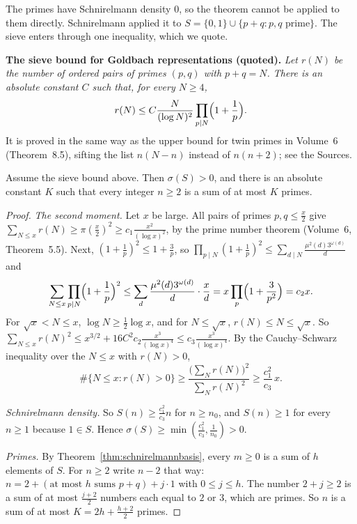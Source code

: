 The primes have Schnirelmann density $0$, so the theorem cannot be applied to them directly. Schnirelmann applied it to $S=\{0,1\}\cup\{p+q:p,q\text{ prime}\}$. The sieve enters through one inequality, which we quote.

\medskip\noindent\textbf{The sieve bound for Goldbach representations (quoted).} \emph{Let $r(N)$ be the number of ordered pairs of primes $(p,q)$ with $p+q=N$. There is an absolute constant $C$ such that, for every $N\ge4$,
\[
r(N)\le C\frac N{(\log N)^2}\prod_{p\mid N}\Bigl(1+\frac1p\Bigr).
\]}
It is proved in the same way as the upper bound for twin primes in Volume~6 (Theorem~8.5), sifting the list $n(N-n)$ instead of $n(n+2)$; see the Sources.

\begin{proposition}\label{prop:goldbachdensity}
Assume the sieve bound above. Then $\sigma(S)>0$, and there is an absolute constant $K$ such that every integer $n\ge2$ is a sum of at most $K$ primes.
\end{proposition}
\begin{proof}
\emph{The second moment.} Let $x$ be large. All pairs of primes $p,q\le\frac x2$ give $\sum_{N\le x}r(N)\ge\pi(\frac x2)^2\ge c_1\frac{x^2}{(\log x)^2}$, by the prime number theorem (Volume~6, Theorem~5.5). Next, $(1+\frac1p)^2\le1+\frac3p$, so $\prod_{p\mid N}(1+\frac1p)^2\le\sum_{d\mid N}\frac{\mu^2(d)3^{\omega(d)}}d$ and
\[
\sum_{N\le x}\prod_{p\mid N}\Bigl(1+\frac1p\Bigr)^2\le\sum_d\frac{\mu^2(d)3^{\omega(d)}}d\cdot\frac xd=x\prod_p\Bigl(1+\frac3{p^2}\Bigr)=c_2x.
\]
For $\sqrt x<N\le x$, $\log N\ge\frac12\log x$, and for $N\le\sqrt x$, $r(N)\le N\le\sqrt x$. So $\sum_{N\le x}r(N)^2\le x^{3/2}+16C^2c_2\frac{x^3}{(\log x)^4}\le c_3\frac{x^3}{(\log x)^4}$. By the Cauchy--Schwarz inequality over the $N\le x$ with $r(N)>0$,
\[
\#\{N\le x:r(N)>0\}\ge\frac{\bigl(\sum_Nr(N)\bigr)^2}{\sum_Nr(N)^2}\ge\frac{c_1^2}{c_3}\,x.
\]

\emph{Schnirelmann density.} So $S(n)\ge\frac{c_1^2}{c_3}n$ for $n\ge n_0$, and $S(n)\ge1$ for every $n\ge1$ because $1\in S$. Hence $\sigma(S)\ge\min(\frac{c_1^2}{c_3},\frac1{n_0})>0$.

\emph{Primes.} By Theorem~\ref{thm:schnirelmannbasis}, every $m\ge0$ is a sum of $h$ elements of $S$. For $n\ge2$ write $n-2$ that way: $n=2+(\text{at most }h\text{ sums }p+q)+j\cdot1$ with $0\le j\le h$. The number $2+j\ge2$ is a sum of at most $\frac{j+2}2$ numbers each equal to $2$ or $3$, which are primes. So $n$ is a sum of at most $K=2h+\frac{h+2}2$ primes.
\end{proof}

